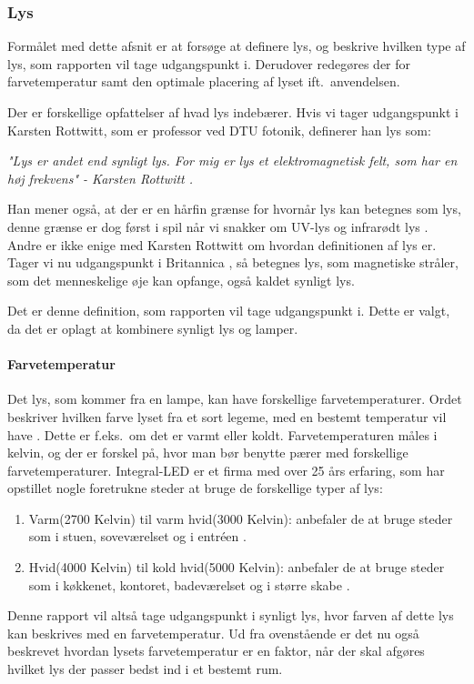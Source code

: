 \subsubsection{Lys}
\label{sec:lys}
Formålet med dette afsnit er at forsøge at definere lys, og beskrive hvilken type af lys, som rapporten vil tage udgangspunkt i. Derudover redegøres der for farvetemperatur samt den optimale placering af lyset ift.\ anvendelsen.


Der er forskellige opfattelser af hvad lys indebærer. Hvis vi tager udgangspunkt i Karsten Rottwitt, som er professor ved DTU fotonik, definerer han lys som:


\textit{"Lys er andet end synligt lys. For mig er lys et elektromagnetisk felt, som har en høj frekvens"
- Karsten Rottwitt \cite{def_lys}.}

Han mener også, at der er en hårfin grænse for hvornår lys kan betegnes som lys, denne grænse er dog først i spil når vi snakker om UV-lys og infrarødt lys \cite{def_lys}. 
Andre er ikke enige med Karsten Rottwitt om hvordan definitionen af lys er. Tager vi nu udgangspunkt i Britannica \cite{britannica_lys}, så betegnes lys, som magnetiske stråler, som det menneskelige øje kan opfange, også kaldet synligt lys. 


Det er denne definition, som rapporten vil tage udgangspunkt i. Dette er valgt, da det er oplagt at kombinere synligt lys og lamper.

\paragraph{Farvetemperatur}
Det lys, som kommer fra en lampe, kan have forskellige farvetemperaturer. Ordet beskriver hvilken farve lyset fra et sort legeme, med en bestemt temperatur vil have \cite{farvetemp}. Dette er f.eks.\ om det er varmt eller koldt. Farvetemperaturen måles i kelvin, og der er forskel på, hvor man bør benytte pærer med forskellige farvetemperaturer. Integral-LED er et firma med over 25 års erfaring, \cite{integral_led} som har opstillet nogle foretrukne steder at bruge de forskellige typer af lys:

\begin{enumerate}
\item Varm(2700 Kelvin) til varm hvid(3000 Kelvin): anbefaler de at bruge steder som i stuen, soveværelset og i entréen \cite{varm_kold}.
\item Hvid(4000 Kelvin) til kold hvid(5000 Kelvin): anbefaler de at bruge steder som i køkkenet, kontoret, badeværelset og i større skabe \cite{varm_kold}.
\end{enumerate}

Denne rapport vil altså tage udgangspunkt i synligt lys, hvor farven af dette lys kan beskrives med en farvetemperatur. Ud fra ovenstående er det nu også beskrevet hvordan lysets farvetemperatur er en faktor, når der skal afgøres hvilket lys der passer bedst ind i et bestemt rum.
